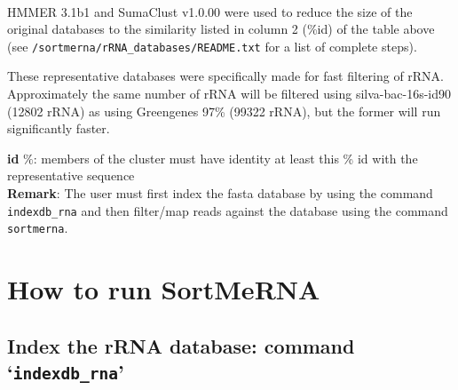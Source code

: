 \documentclass[10pt,a4paper]{article}
\begin{document}
~\\

HMMER 3.1b1 and SumaClust v1.0.00 were used to reduce the size of the original databases to the similarity listed in column 2 (\%id) of the table above
(see {\tt/sortmerna/rRNA\_databases/README.txt} for a list of complete steps). 

These representative databases were specifically made for fast filtering of rRNA. Approximately the same number of rRNA will be filtered
using silva-bac-16s-id90 (12802 rRNA) as using Greengenes 97\% (99322 rRNA), but the former will run significantly faster.

\noindent \textbf{id} $\%$: members of the cluster must have identity at least this \% id with the representative sequence \\

\noindent \textbf{Remark}: The user must first index the fasta database by using the command \texttt{indexdb\_rna} and 
then filter/map reads against the database using the command \texttt{sortmerna}.

\section{How to run SortMeRNA}
\subsection{Index the rRNA database: command `\texttt{indexdb\_rna}'}
\end{document}

